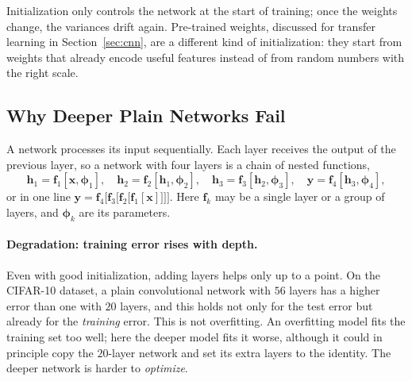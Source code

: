\noindent
Initialization only controls the network at the start of training; once the
weights change, the variances drift again. Pre-trained weights, discussed for
transfer learning in Section~\ref{sec:cnn}, are a different kind of
initialization: they start from weights that already encode useful features
instead of from random numbers with the right scale.

\subsection{Why Deeper Plain Networks Fail}

A network processes its input sequentially. Each layer receives the output of
the previous layer, so a network with four layers is a chain of nested
functions,
\begin{equation}
  \mathbf{h}_1 = \mathbf{f}_1[\mathbf{x}, \boldsymbol{\phi}_1],\quad
  \mathbf{h}_2 = \mathbf{f}_2[\mathbf{h}_1, \boldsymbol{\phi}_2],\quad
  \mathbf{h}_3 = \mathbf{f}_3[\mathbf{h}_2, \boldsymbol{\phi}_3],\quad
  \mathbf{y} = \mathbf{f}_4[\mathbf{h}_3, \boldsymbol{\phi}_4],
\end{equation}
or in one line
$\mathbf{y} = \mathbf{f}_4\bigl[\mathbf{f}_3\bigl[\mathbf{f}_2\bigl[\mathbf{f}_1[\mathbf{x}]\bigr]\bigr]\bigr]$.
Here $\mathbf{f}_k$ may be a single layer or a group of layers, and
$\boldsymbol{\phi}_k$ are its parameters.

\paragraph{Degradation: training error rises with depth.}
Even with good initialization, adding layers helps only up to a point. On the
CIFAR-10 dataset, a plain convolutional network with $56$ layers has a higher
error than one with $20$ layers, and this holds not only for the test error but
already for the \emph{training} error. This is not overfitting. An overfitting
model fits the training set too well; here the deeper model fits it worse,
although it could in principle copy the $20$-layer network and set its extra
layers to the identity. The deeper network is harder to \emph{optimize}.

